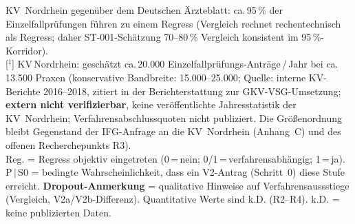 \documentclass{umbruch-position}
\begin{document}
{\smallskip
\noindent[$^{*}$] KV~Nordrhein gegenüber dem Deutschen Ärzteblatt: ca.\,95\,\% der Einzelfallprüfungen führen zu einem Regress (Vergleich rechnet rechentechnisch als Regress; daher ST-001-Schätzung 70--80\,\% Vergleich konsistent im 95\,\%-Korridor).\\
{[$^{\ddagger}$] KV\,Nordrhein: gesch\"atzt ca.\,20.000 Einzelfallpr\"ufungs-Antr\"age\,/\,Jahr bei ca.\,13.500 Praxen (konservative Bandbreite: 15.000--25.000; Quelle: interne KV-Berichte 2016--2018, zitiert in der Berichter\-stattung zur GKV-VSG-Umsetzung; \textbf{extern nicht verifizierbar}, keine ver\"offentlichte Jahresstatistik der KV~Nordrhein; Verfahrens\-abschluss\-quoten nicht publiziert. Die Gr\"o\ss{}enordnung bleibt Gegenstand der IFG-Anfrage an die KV~Nordrhein (Anhang~C) und des offenen Recherchepunkts R3).}\\
Reg. = Regress objektiv eingetreten (0\,=\,nein; 0/1\,=\,verfahrensabhängig; 1\,=\,ja).\\
P\,$|$\,S0 = bedingte Wahrscheinlichkeit, dass ein V2-Antrag (Schritt~0) diese Stufe erreicht. \quad
\textbf{Dropout-Anmerkung} = qualitative Hinweise auf Verfahrensaussstiege (Vergleich, V2a/V2b-Differenz). Quantitative Werte sind k.D. (R2--R4). \quad
k.D. = keine publizierten Daten.
}
\end{document}
